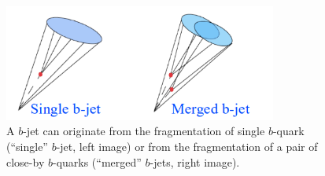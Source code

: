 \begin{figure}[h]
\centering
\includegraphics[width=0.8\textwidth]{FIGS/Single_b_Merged_bb.png}
\caption{A $b$-jet can originate from the fragmentation of single $b$-quark (``single'' $b$-jet, left image) or from the fragmentation  of a pair of close-by $b$-quarks
(``merged'' $b$-jets, right image).}
\label{fig:gbbcartoon}
\end{figure}



 



